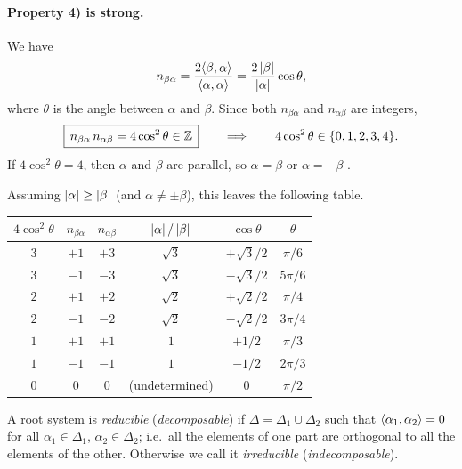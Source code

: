 \paragraph{Property 4) is strong.}
We have
\[
  n_{\beta\alpha} = \frac{2\langle \beta, \alpha\rangle}{\langle \alpha, \alpha\rangle} = \frac{2\left\lvert \beta \right\rvert}{\left\lvert \alpha \right\rvert}\cos\theta,
\]
where $\theta$ is the angle between $\alpha$ and $\beta$. Since both $n_{\beta\alpha}$ and $n_{\alpha\beta}$ are integers,
\[
  \boxed{\,n_{\beta\alpha}\,n_{\alpha\beta} = 4\cos^2\theta\in\mathbb{Z}\,}
  \qquad\Longrightarrow\qquad 4\cos^2\theta\in\{0,1,2,3,4\}.
\]
If $4\cos^2\theta=4$, then $\alpha$ and $\beta$ are parallel, so $\alpha=\beta$ or $\alpha=-\beta$
.

Assuming $\left\lvert \alpha \right\rvert\ge\left\lvert \beta \right\rvert$ (and $\alpha\neq\pm\beta$), this leaves the following table.
\begin{center}
\renewcommand{\arraystretch}{1.25}
\begin{tabular}{cccccc}
\toprule
$4\cos^2\theta$ & $n_{\beta\alpha}$ & $n_{\alpha\beta}$ & $\left\lvert \alpha \right\rvert/\left\lvert \beta \right\rvert$ & $\cos\theta$ & $\theta$\\
\midrule
$3$ & $+1$ & $+3$ & $\sqrt3$ & $+\sqrt3/2$ & $\pi/6$\\
$3$ & $-1$ & $-3$ & $\sqrt3$ & $-\sqrt3/2$ & $5\pi/6$\\
$2$ & $+1$ & $+2$ & $\sqrt2$ & $+\sqrt2/2$ & $\pi/4$\\
$2$ & $-1$ & $-2$ & $\sqrt2$ & $-\sqrt2/2$ & $3\pi/4$\\
$1$ & $+1$ & $+1$ & $1$ & $+1/2$ & $\pi/3$\\
$1$ & $-1$ & $-1$ & $1$ & $-1/2$ & $2\pi/3$\\
$0$ & $0$ & $0$ & (undetermined) & $0$ & $\pi/2$\\
\bottomrule
\end{tabular}
\end{center}

\begin{definition}\label{L04a:def:reducible}
A root system is \emph{reducible} (\emph{decomposable}) if $\Delta=\Delta_1\cup\Delta_2$
 such that $\langle \alpha_1, \alpha_2\rangle=0$ for all
$\alpha_1\in\Delta_1$, $\alpha_2\in\Delta_2$; i.e.\ all the elements of one part are orthogonal to all
the elements of the other. Otherwise we call it \emph{irreducible} (\emph{indecomposable}).
\end{definition}

